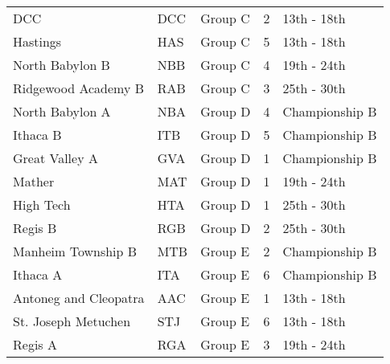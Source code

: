 \documentclass{article}%
\begin{document}
\begin{longtable}{|ll|lc|l|}
DCC&DCC&Group C&2&13th {-} 18th\\%
Hastings&HAS&Group C&5&13th {-} 18th\\%
North Babylon B&NBB&Group C&4&19th {-} 24th\\%
Ridgewood Academy B&RAB&Group C&3&25th {-} 30th\\%
North Babylon A&NBA&Group D&4&Championship B\\%
Ithaca B&ITB&Group D&5&Championship B\\%
Great Valley A&GVA&Group D&1&Championship B\\%
Mather&MAT&Group D&1&19th {-} 24th\\%
High Tech&HTA&Group D&1&25th {-} 30th\\%
Regis B&RGB&Group D&2&25th {-} 30th\\%
Manheim Township B&MTB&Group E&2&Championship B\\%
Ithaca A&ITA&Group E&6&Championship B\\%
Antoneg and Cleopatra&AAC&Group E&1&13th {-} 18th\\%
St. Joseph Metuchen&STJ&Group E&6&13th {-} 18th\\%
Regis A&RGA&Group E&3&19th {-} 24th\\%
\end{longtable}%
\end{document}
